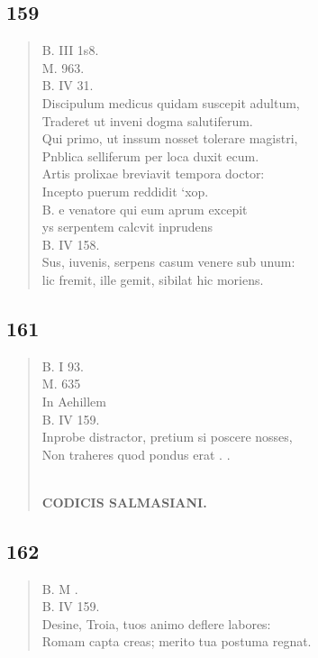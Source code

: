 \documentclass[11pt, a4paper]{report}
\begin{document}
            \subsection*{159}
      \begin{verse}
      B. III 1s8. \\ M. 963. \\ B. IV 31. \\ Discipulum medicus quidam suscepit adultum, \\ Traderet ut inveni dogma salutiferum. \\ Qui primo, ut inssum nosset tolerare magistri, \\ Pnblica selliferum per loca duxit ecum. \\ Artis prolixae breviavit tempora doctor: \\ Incepto puerum reddidit ‘xop. \\ 
        ﻿\pagebreak 
     \marginpar{[160]} B. e venatore qui eum aprum excepit \\ ys serpentem calcvit inprudens \\ B. IV 158. \\ Sus, iuvenis, serpens casum venere sub unum: \\ lic fremit, ille gemit, sibilat hic moriens. \\ 
      \end{verse}
  
            \subsection*{161}
      \begin{verse}
      B. I 93. \\ M. 635 \\ In Aehillem \\ B. IV 159. \\ Inprobe distractor, pretium si poscere nosses, \\ Non traheres quod pondus erat . . \\ 
        ﻿\pagebreak 
    \begin{center} \textbf{CODICIS SALMASIANI.} \end{center} \marginpar{[149]} 
      \end{verse}
  
            \subsection*{162}
      \begin{verse}
      B. M . \\ B. IV 159. \\ Desine, Troia, tuos animo deflere labores: \\ Romam capta creas; merito tua postuma regnat. \\ 
      \end{verse}
  
\end{document}
